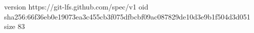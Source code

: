 version https://git-lfs.github.com/spec/v1
oid sha256:66f36eb0e19073ea3c455cb3f075dfbcbf09ac087829de10d3e9b1f504d3d051
size 83

